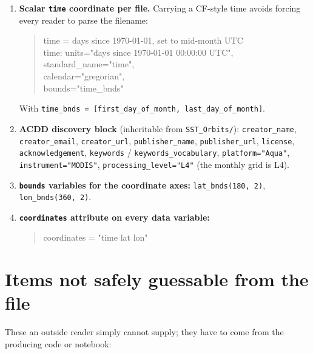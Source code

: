 \documentclass[11pt]{article}
\begin{document}
\begin{enumerate}[leftmargin=*,topsep=2pt,start=7]
  \item \textbf{Scalar \texttt{time} coordinate per file.} Carrying
    a CF-style time avoids forcing every reader to parse the
    filename:
    \begin{quote}\ttfamily
      time = days since 1970-01-01, set to mid-month UTC \\
      time: units="days since 1970-01-01 00:00:00 UTC", \\
      \phantom{time: }standard\_name="time", \\
      \phantom{time: }calendar="gregorian", \\
      \phantom{time: }bounds="time\_bnds"
    \end{quote}
    With \texttt{time\_bnds = [first\_day\_of\_month,
    last\_day\_of\_month]}.

  \item \textbf{ACDD discovery block} (inheritable from
    \texttt{SST\_Orbits/}): \texttt{creator\_name},
    \texttt{creator\_email}, \texttt{creator\_url},
    \texttt{publisher\_name}, \texttt{publisher\_url},
    \texttt{license}, \texttt{acknowledgement},
    \texttt{keywords} / \texttt{keywords\_vocabulary},
    \texttt{platform="Aqua"}, \texttt{instrument="MODIS"},
    \texttt{processing\_level="L4"} (the monthly grid is L4).

  \item \textbf{\texttt{bounds} variables for the coordinate axes:}
    \texttt{lat\_bnds(180, 2)},
    \texttt{lon\_bnds(360, 2)}.

  \item \textbf{\texttt{coordinates} attribute on every data
    variable:}
    \begin{quote}\ttfamily
      coordinates = "time lat lon"
    \end{quote}
\end{enumerate}

\section*{Items not safely guessable from the file}

These an outside reader simply cannot supply; they have to come
from the producing code or notebook:
\end{document}
